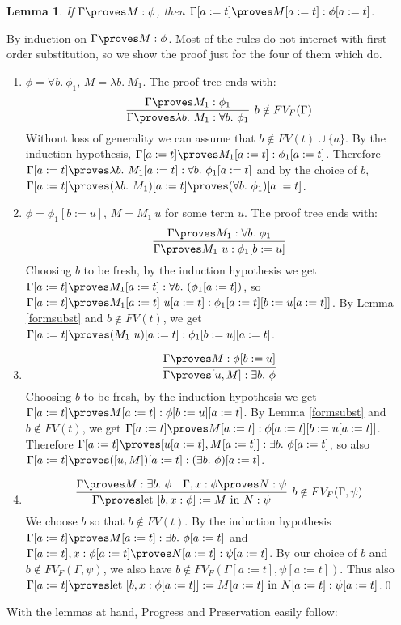 \documentclass{LMCS}
\newtheorem{lemma}[thm]{Lemma}
\newcommand{\p}{\proves}
\newcommand{\g}{\Gamma}
\newcommand{\gp}{\Gamma \proves}
\newcommand{\pl}[1]{\ensuremath{\mathrm{#1}}}
\newcommand{\LET}{\pl{let}}
\newcommand{\IN}{\pl{in}}
\begin{document}
\begin{lemma}\label{logsl}
If $\gp M : \phi$, then $\Gamma[a:=t] \proves M[a:=t] : \phi[a:=t]$.
\end{lemma}
\proof By induction on $\gp M : \phi$. Most of the rules do not interact with
first-order substitution, so we show the proof just for the four of them which
do. 
\begin{enumerate}[$\bullet$]
\item $\phi = \forall b.\ \phi_1$, $M = \lambda b.\ M_1$. The proof tree ends with:
\[
\infer[b \notin FV_F(\g)]{\gp \lambda b.\ M_1 : \forall b.\ \phi_1}{\g \proves M_1 : \phi_1}
\]
Without loss of generality we can assume that $b \notin FV(t) \cup \{ a \}$. By the induction hypothesis, $\Gamma[a:=t] \proves M_1[a:=t] :
\phi_1[a:=t]$. Therefore $\g[a:=t] \p \lambda b.\ M_1[a:=t] : \forall
b.\ \phi_1[a:=t]$ and by the choice of $b$, $\g[a:=t] \p (\lambda b.\ M_1)[a:=t] \p (\forall b.\ \phi_1)[a:=t]$. 
\item $\phi = \phi_1[b:=u]$, $M = M_1\ u$ for some term $u$. The proof tree ends with:
\[
\infer{\gp M_1\ u : \phi_1[b:=u]}{\gp M_1 : \forall b.\ \phi_1}
\]
Choosing $b$ to be fresh, by the induction hypothesis we get $\g[a:=t] \p
M_1[a:=t] : \forall b.\ (\phi_1[a:=t])$, so $\g[a:=t] \p M_1[a:=t]\ u[a:=t] :
\phi_1[a:=t][b:=u[a:=t]]$. By Lemma \ref{formsubst} and $b \notin FV(t)$, we
get $\g[a:=t] \p (M_1\ u)[a:=t] : \phi_1[b:=u][a:=t]$.
\item 
\[
\infer{\gp [u, M] : \exists b.\ \phi}{\gp M : \phi[b:=u]}
\]
Choosing $b$ to be fresh, by the induction hypothesis we get $\g[a:=t] \p M[a:=t] : \phi[b:=u][a:=t]$. 
By Lemma \ref{formsubst} and $b \notin FV(t)$, we get $\g[a:=t] \p M[a:=t] :
\phi[a:=t][b:=u[a:=t]]$. Therefore $\g[a:=t] \p [u[a:=t], M[a:=t]] : \exists
b.\ \phi[a:=t]$, so also $\g[a:=t] \p ([u, M])[a:=t] : (\exists b.\
\phi)[a:=t]$.
\item
\[
\infer[b \notin FV_F(\g, \psi)]{\gp \LET\ [b, x : \phi] := M\ \IN\
N : \psi}{\gp M : \exists b.\ \phi & \g,  x : \phi \proves N : \psi} 
\]
We choose $b$ so that $b \notin FV(t)$. By the induction hypothesis $\g[a:=t] \p M[a:=t]
: \exists b.\ \phi[a:=t]$ and $\g[a:=t], x : \phi[a:=t] \p N[a:=t] :
\psi[a:=t]$. By our choice of $b$ and $b \notin FV_F(\g, \psi)$, we also
have $b \notin FV_F(\g[a:=t], \psi[a:=t])$. Thus also $\g[a:=t] \p \LET\  [b, x : \phi[a:=t]] := M[a:=t]\ \IN\ N[a:=t] :
\psi[a:=t]$.\qed
\end{enumerate}


With the lemmas at hand, Progress and Preservation easily follow:
\end{document}
